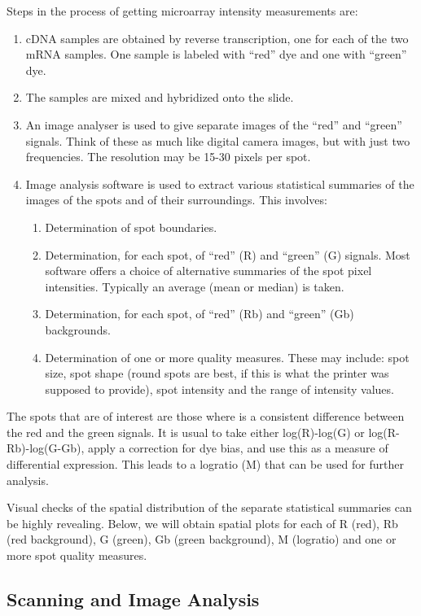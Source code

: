 \documentclass[a4paper,9pt]{article}\usepackage[]{graphicx}\usepackage[]{color}
\begin{document}
Steps in the process of getting microarray intensity measurements are:
\begin{enumerate}
\item cDNA samples are obtained by reverse transcription, one for each
of the two mRNA samples. One sample is labeled with ``red'' dye and
one with ``green'' dye.
\item The samples are mixed and hybridized onto the slide.
\item An image analyser is used to give separate images of the ``red''
and ``green'' signals. Think of these as much like digital camera
images, but with just two frequencies. The resolution may be 15-30
pixels per spot.
\item Image analysis software is used to extract various statistical
summaries of the images of the spots and of their surroundings.  This
involves:
\begin{enumerate}
\item Determination of spot boundaries.
\item Determination, for each spot, of ``red'' (R) and ``green'' (G)
signals. Most software offers a choice of alternative summaries of the spot
pixel intensities.  Typically an average (mean or median) is taken.
\item Determination, for each spot, of ``red'' (Rb) and ``green'' (Gb)
backgrounds.
\item Determination of one or more quality measures.  These may include:
spot size, spot shape (round spots are best, if this is what the
printer was supposed to provide), spot intensity and the range of
intensity values.
\end{enumerate}
\end{enumerate}
The spots that are of interest are those where is a consistent difference
between the red and the green signals. It is usual to take either
log(R)-log(G) or log(R-Rb)-log(G-Gb), apply a correction for dye bias,
and use this as a measure of differential expression.  This leads to
a logratio (M) that can be used for further analysis.

Visual checks of the spatial distribution of the separate statistical
summaries can be highly revealing.  Below, we will obtain spatial plots
for each of R (red), Rb (red background), G (green), Gb (green background),
M (logratio) and one or more spot quality measures.

\subsection{Scanning and Image Analysis}
\end{document}
